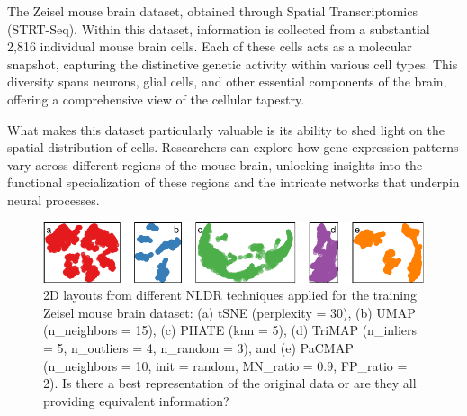 \documentclass[
  12pt]{article}
\begin{document}
The Zeisel mouse brain dataset, obtained through Spatial Transcriptomics
(STRT-Seq). Within this dataset, information is collected from a
substantial 2,816 individual mouse brain cells. Each of these cells acts
as a molecular snapshot, capturing the distinctive genetic activity
within various cell types. This diversity spans neurons, glial cells,
and other essential components of the brain, offering a comprehensive
view of the cellular tapestry.

What makes this dataset particularly valuable is its ability to shed
light on the spatial distribution of cells. Researchers can explore how
gene expression patterns vary across different regions of the mouse
brain, unlocking insights into the functional specialization of these
regions and the intricate networks that underpin neural processes.

\begin{figure}

{\centering \includegraphics[width=1\textwidth,height=\textheight]{paper_files/figure-pdf/fig-nldervis5Mouse-1.pdf}

}

\caption{\label{fig-nldervis5Mouse}2D layouts from different NLDR
techniques applied for the training Zeisel mouse brain dataset: (a) tSNE
(perplexity = 30), (b) UMAP (n\_neighbors = 15), (c) PHATE (knn = 5),
(d) TriMAP (n\_inliers = 5, n\_outliers = 4, n\_random = 3), and (e)
PaCMAP (n\_neighbors = 10, init = random, MN\_ratio = 0.9, FP\_ratio =
2). Is there a best representation of the original data or are they all
providing equivalent information?}

\end{figure}
\end{document}
